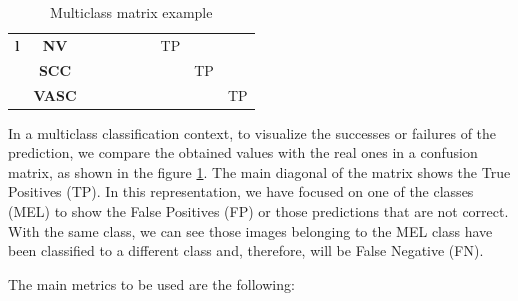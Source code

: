 \begin{table}[ht]
\begin{tabular}{lclllccccc}
\multicolumn{1}{c|}{\textbf{l}} & \multicolumn{1}{c|}{\textbf{NV}} & \multicolumn{1}{l|}{} & \multicolumn{1}{l|}{} & \multicolumn{1}{l|}{} & \multicolumn{1}{l|}{} & \multicolumn{1}{l|}{} & \multicolumn{1}{c|}{\cellcolor[HTML]{EFEFEF}TP} & \multicolumn{1}{l|}{} & \multicolumn{1}{l|}{} \\ \cline{2-10} 
\multicolumn{1}{c|}{\textbf{}} & \multicolumn{1}{c|}{\textbf{SCC}} & \multicolumn{1}{l|}{} & \multicolumn{1}{l|}{} & \multicolumn{1}{l|}{} & \multicolumn{1}{l|}{} & \multicolumn{1}{l|}{} & \multicolumn{1}{l|}{} & \multicolumn{1}{c|}{\cellcolor[HTML]{EFEFEF}TP} & \multicolumn{1}{l|}{} \\ \cline{2-10} 
\multicolumn{1}{l|}{} & \multicolumn{1}{c|}{\textbf{VASC}} & \multicolumn{1}{l|}{} & \multicolumn{1}{l|}{} & \multicolumn{1}{l|}{} & \multicolumn{1}{l|}{} & \multicolumn{1}{l|}{} & \multicolumn{1}{l|}{} & \multicolumn{1}{l|}{} & \multicolumn{1}{c|}{\cellcolor[HTML]{EFEFEF}TP} \\ \cline{2-10} 
\end{tabular}
    \caption{Multiclass matrix example}
    \label{tbl: Multiclass_matrix}
\end{table}

In a multiclass classification context, to visualize the successes or failures of the prediction, we compare the obtained values with the real ones in a confusion matrix, as shown in the figure \ref{tbl: Multiclass_matrix}. The main diagonal of the matrix shows the True Positives (TP). In this representation, we have focused on one of the classes (MEL) to show the False Positives (FP) or those predictions that are not correct. With the same class, we can see those images belonging to the MEL class have been classified to a different class and, therefore, will be False Negative (FN).

The main metrics to be used are the following:

